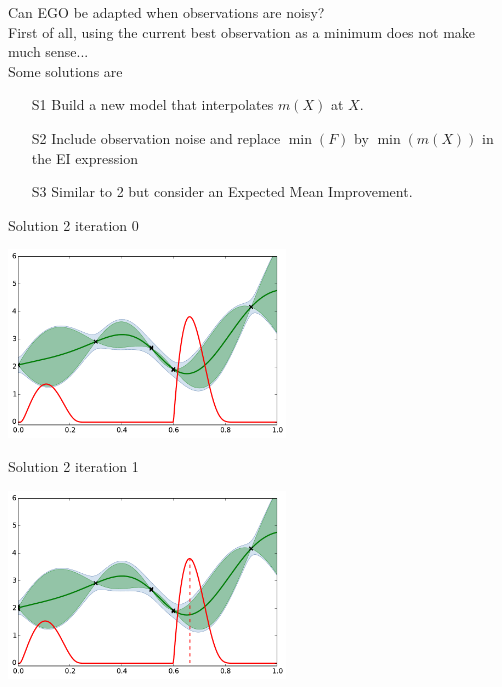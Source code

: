 \documentclass{beamer}
\begin{document}
\begin{frame}{}
Can EGO be adapted when observations are noisy?\\
\vspace{5mm}
First of all, using the current best observation as a minimum does not make much sense...\\
\vspace{5mm}
Some solutions are
\begin{itemize}
	\item[S1] Build a new model that interpolates $m(X)$ at $X$. 
	\item[S2] Include observation noise and replace $\min(F)$ by $\min(m(X))$ in the EI expression
	\item[S3] Similar to 2 but consider an Expected Mean Improvement.
\end{itemize}
\end{frame}

\begin{frame}{Solution 2}
iteration 0
\begin{center}
\includegraphics[height=5cm]{figures/python/ego_EI1n0}
\end{center}
\end{frame}

\begin{frame}[noframenumbering]{Solution 2}
iteration 1
\begin{center}
\includegraphics[height=5cm]{figures/python/ego_EI1n1}
\end{center}
\end{frame}
\end{document}
